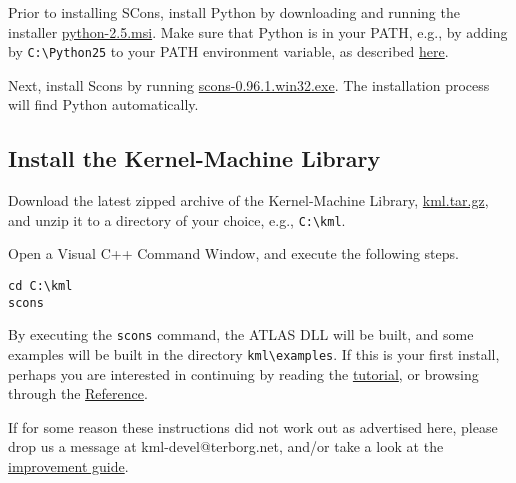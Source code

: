 \documentclass{article}
\begin{document}
Prior to installing SCons, install Python
by downloading and running the installer \href{http://www.python.org/ftp/python/2.5/python-2.5.msi}{python-2.5.msi}.
Make sure that Python is in your PATH, e.g., by adding by \texttt{C:\textbackslash Python25} 
to your PATH environment variable, as
described \href{http://www.python.org/doc/faq/windows.html#how-do-i-run-a-python-program-under-windows}{here}.

Next, install Scons by running 
\href{http://prdownloads.sourceforge.net/scons/scons-0.96.1.win32.exe?download}{scons-0.96.1.win32.exe}. 
The installation process will find
Python automatically.

\subsection{Install the Kernel-Machine Library}
Download the latest zipped archive of the Kernel-Machine Library, 
\href{http://www.terborg.net/cgi-bin/viewcvs.cgi/trunk/kml.tar.gz?view=tar}{kml.tar.gz}, 
and unzip it to a directory of your choice, e.g., \texttt{C:\textbackslash kml}.

Open a Visual C++ Command Window, and execute the following steps.
%
\begin{verbatim}
cd C:\kml
scons
\end{verbatim}
%
By executing the \texttt{scons} command, the ATLAS DLL will be built, 
and some examples will be built in the directory \texttt{kml\textbackslash examples}.
If this is your first install, perhaps you are interested in continuing 
by reading the \href{\kmlroot/tutorial.html}{tutorial}, or browsing through 
the \href{\kmlroot/reference/}{Reference}.

If for some reason these instructions did not work out as advertised here,
please drop us a message at kml-devel@terborg.net, and/or take a look
at the \href{\kmlroot/improve.html}{improvement guide}.



\end{document}
